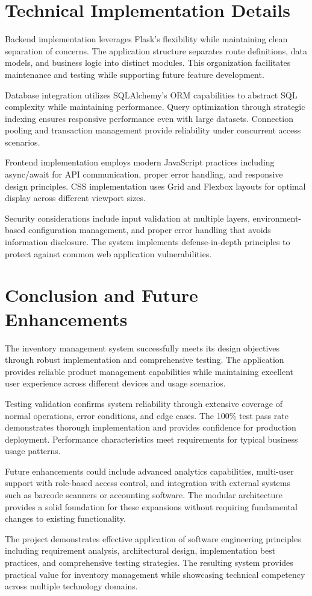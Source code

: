 \documentclass[12pt,a4paper]{article}
\begin{document}
\section{Technical Implementation Details}

Backend implementation leverages Flask's flexibility while maintaining clean separation of concerns. The application structure separates route definitions, data models, and business logic into distinct modules. This organization facilitates maintenance and testing while supporting future feature development.

Database integration utilizes SQLAlchemy's ORM capabilities to abstract SQL complexity while maintaining performance. Query optimization through strategic indexing ensures responsive performance even with large datasets. Connection pooling and transaction management provide reliability under concurrent access scenarios.

Frontend implementation employs modern JavaScript practices including async/await for API communication, proper error handling, and responsive design principles. CSS implementation uses Grid and Flexbox layouts for optimal display across different viewport sizes.

Security considerations include input validation at multiple layers, environment-based configuration management, and proper error handling that avoids information disclosure. The system implements defense-in-depth principles to protect against common web application vulnerabilities.

\section{Conclusion and Future Enhancements}

The inventory management system successfully meets its design objectives through robust implementation and comprehensive testing. The application provides reliable product management capabilities while maintaining excellent user experience across different devices and usage scenarios.

Testing validation confirms system reliability through extensive coverage of normal operations, error conditions, and edge cases. The 100\% test pass rate demonstrates thorough implementation and provides confidence for production deployment. Performance characteristics meet requirements for typical business usage patterns.

Future enhancements could include advanced analytics capabilities, multi-user support with role-based access control, and integration with external systems such as barcode scanners or accounting software. The modular architecture provides a solid foundation for these expansions without requiring fundamental changes to existing functionality.

The project demonstrates effective application of software engineering principles including requirement analysis, architectural design, implementation best practices, and comprehensive testing strategies. The resulting system provides practical value for inventory management while showcasing technical competency across multiple technology domains.
\end{document}
